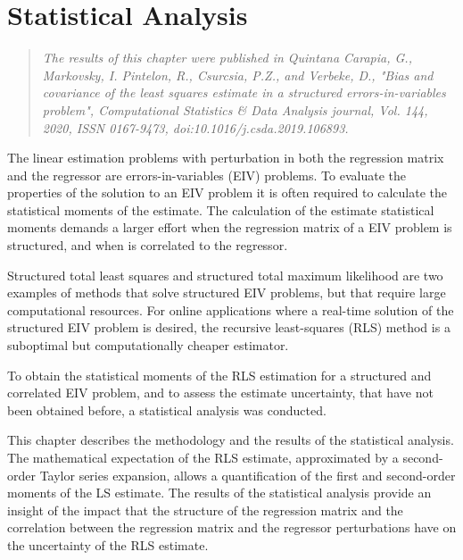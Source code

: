 
\glsresetall

\chapter{Statistical Analysis} \label{chap:StatisticalAnalysis}

\begin{quote}
\emph{The results of this chapter were published in Quintana Carapia, G., Markovsky, I. Pintelon, R., Csurcsia, P.Z., and Verbeke, D., "Bias and covariance of the least squares estimate in a structured errors-in-variables problem", Computational Statistics & Data Analysis journal, Vol. 144, 2020, ISSN 0167-9473, doi:10.1016/j.csda.2019.106893. \nocite{QuintanaCSDA} }\vfill{}
\end{quote}


\vfill{}


The linear estimation problems with perturbation in both the regression matrix and the regressor are errors-in-variables (EIV) problems.
To evaluate the properties of the solution to an EIV problem it is often required to calculate the statistical moments of the estimate.
The calculation of the estimate statistical moments demands a larger effort when the regression matrix of a EIV problem is structured, and when is correlated to the regressor.

Structured total least squares and structured total maximum likelihood are two examples of methods that solve structured EIV problems, but that require large computational resources.
For online applications where a real-time solution of the structured EIV problem is desired, the recursive least-squares (RLS) method is a suboptimal but computationally cheaper estimator.

To obtain the statistical moments of the RLS estimation for a structured and correlated EIV problem, and to assess the estimate uncertainty, that have not been obtained before, a statistical analysis was conducted.

This chapter describes the methodology and the results of the statistical analysis.
The mathematical expectation of the RLS estimate, approximated by a second-order Taylor series expansion, allows a quantification of the first and second-order moments of the LS estimate.
The results of the statistical analysis provide an insight of the impact that the structure of the regression matrix and the correlation between the regression matrix and the regressor perturbations have on the uncertainty of the RLS estimate.

